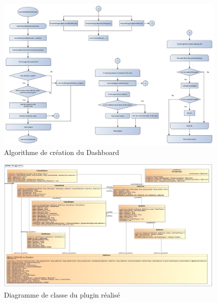 \begin{figure}[!h]
  \centering
      \includegraphics[width=\textheight,angle=90]{images/dashboardGenesis.jpg}
  \caption{Algorithme de création du Dashboard}
	\label{figure:dashboardGenesis}
\end{figure}


\begin{figure}[!h]
  \centering
      \includegraphics[width=\textheight,angle=90]{images/myDash.jpg}
  \caption{Diagramme de classe du plugin réalisé}
	\label{figure:myDash}
\end{figure}
